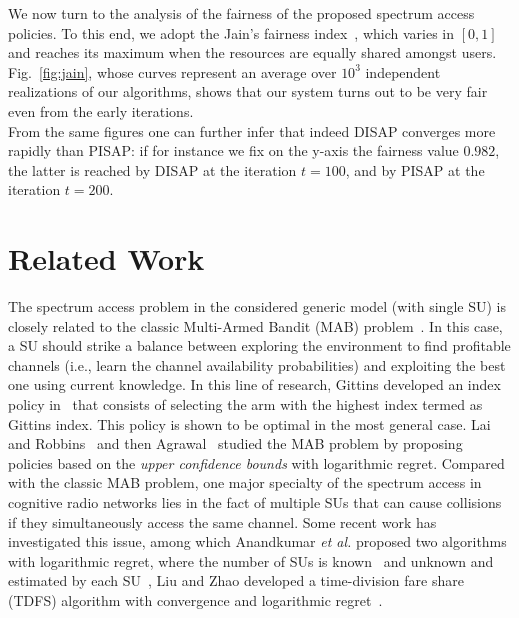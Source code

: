 \documentclass[12pt, onecolumn]{IEEEtran}
\theoremstyle{plain}
\theoremstyle{definition}
\begin{document}
We now turn to the analysis of the fairness of the proposed spectrum access policies. To this end, we adopt the Jain's fairness index~\cite{jains84}, which varies in $[0, 1]$ and reaches its maximum when
the resources are equally shared amongst users. Fig.~\ref{fig:jain}, whose curves represent an average over $10^3$ independent realizations of our algorithms, shows that our system turns out to be very fair
even from the early iterations.\\
From the same figures one can further infer that indeed DISAP converges more rapidly than PISAP: if for instance we fix on the y-axis the fairness value $0.982$, the latter
is reached by DISAP at the iteration $t=100$, and by PISAP at the iteration $t=200$.








\section{Related Work}
\label{sec:related_work}

The spectrum access problem in the considered gene\-ric model (with single SU) is closely related to the classic Multi-Armed Bandit (MAB) problem~\cite{Mahajan07}. In this case, a SU should strike a balance between exploring the environment to find profitable channels (i.e., learn the channel availability probabilities) and exploiting the best one using current knowledge. In this line of research, Gittins developed an index policy in~\cite{Gittins89} that consists of selecting the arm with the highest index termed as Gittins index. This policy is shown to be optimal in the most general case. Lai and Robbins~\cite{Lai85} and then Agrawal~\cite{Agrawal95} studied the MAB problem by proposing policies based on the {\it upper confidence bounds} with logarithmic regret. Compared with the classic MAB problem, one major specialty of the spectrum access in cognitive radio networks lies in the fact of multiple SUs that can cause collisions if they simultaneously access the same channel. Some recent work has investigated this issue, among which Anandkumar \textit{et al.} proposed two algorithms with logarithmic regret, where the number of SUs is known~\cite{Anand09} and unknown and estimated by each SU~\cite{Anand10}, Liu and Zhao developed a time-division fare share (TDFS) algorithm with convergence and logarithmic regret~\cite{Liu09}. 
\end{document}
